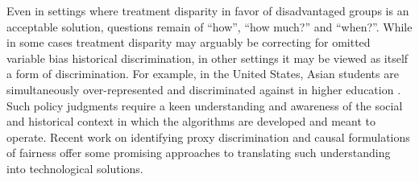 Even in settings where treatment disparity in favor of disadvantaged groups is an acceptable solution, 
questions remain of ``how'', ``how much?'' and ``when?''.
While in some cases treatment disparity may arguably be correcting for omitted variable bias historical discrimination, in other settings it may be viewed as itself a form of discrimination.
For example, in the United States, 
Asian students are simultaneously 
over-represented and discriminated 
against in higher education \citep{AsianNYT}.
Such policy judgments require a keen understanding 
and awareness of the social and historical context 
in which the algorithms are developed and meant to operate. 
Recent work on identifying proxy discrimination \citep{datta2017proxy} and causal formulations of fairness \citep{nabi2017fair,kilbertus2017avoiding,kusner2017counterfactual} 
offer some promising approaches to translating such understanding into technological solutions.  

